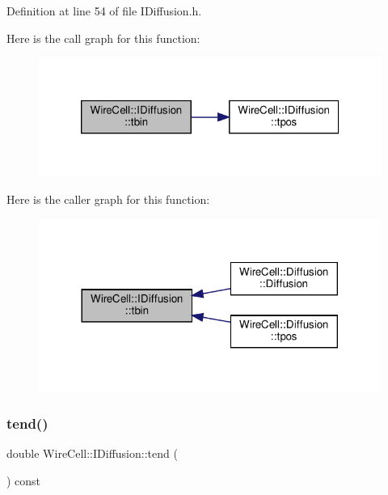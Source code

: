 Definition at line 54 of file I\+Diffusion.\+h.

Here is the call graph for this function\+:
\nopagebreak
\begin{figure}[H]
\begin{center}
\leavevmode
\includegraphics[width=320pt]{class_wire_cell_1_1_i_diffusion_abf2ecc1831078625a9f0fd439d773ce8_cgraph}
\end{center}
\end{figure}
Here is the caller graph for this function\+:
\nopagebreak
\begin{figure}[H]
\begin{center}
\leavevmode
\includegraphics[width=317pt]{class_wire_cell_1_1_i_diffusion_abf2ecc1831078625a9f0fd439d773ce8_icgraph}
\end{center}
\end{figure}
\mbox{\label{class_wire_cell_1_1_i_diffusion_ab14ac45f6a21301ba83eebd9d5eabff2}} 
\subsubsection{\texorpdfstring{tend()}{tend()}}
{\footnotesize\ttfamily double Wire\+Cell\+::\+I\+Diffusion\+::tend (\begin{DoxyParamCaption}{ }\end{DoxyParamCaption}) const\hspace{0.3cm}{\ttfamily [inline]}}




